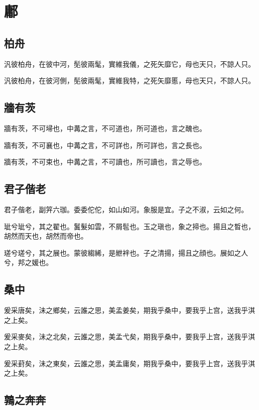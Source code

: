 \section[鄘]{鄘}

\subsection[柏舟]{柏舟}

汎彼柏舟，在彼中河，髧彼兩髦，實維我儀，之死矢靡它，母也天只，不諒人只。

汎彼柏舟，在彼河側，髧彼兩髦，實維我特，之死矢靡慝，母也天只，不諒人只。

\subsection[牆有茨]{牆有茨}

牆有茨，不可埽也，中冓之言，不可道也，所可道也，言之醜也。

牆有茨，不可襄也，中冓之言，不可詳也，所可詳也，言之長也。

牆有茨，不可束也，中冓之言，不可讀也，所可讀也，言之辱也。

\subsection[君子偕老]{君子偕老}

君子偕老，副笄六珈。委委佗佗，如山如河。象服是宜。子之不淑，云如之何。

玼兮玼兮，其之翟也。鬒髮如雲，不屑髢也。玉之瑱也，象之揥也。揚且之晳也，胡然而天也，胡然而帝也。

瑳兮瑳兮，其之展也。蒙彼縐絺，是紲袢也。子之清揚，揚且之顔也。展如之人兮，邦之媛也。

\subsection[桑中]{桑中}

爰采唐矣，沬之鄉矣，云誰之思，美孟姜矣，期我乎桑中，要我乎上宫，送我乎淇之上矣。

爰采麥矣，沬之北矣，云誰之思，美孟弋矣，期我乎桑中，要我乎上宫，送我乎淇之上矣。

爰采葑矣，沬之東矣，云誰之思，美孟庸矣，期我乎桑中，要我乎上宫，送我乎淇之上矣。

\subsection[鶉之奔奔]{鶉之奔奔}


